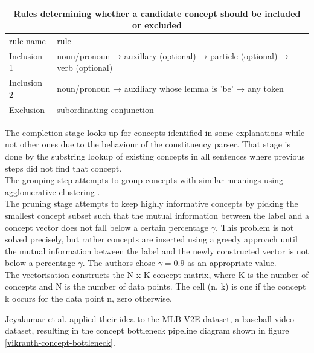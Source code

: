 \begin{center}
\begin{tabular}{ |p{2cm}|p{12cm}|  }
 \hline
 \multicolumn{2}{|c|}{Rules determining whether a candidate concept should be included or excluded} \\
 \hline
 rule name & rule \\
 \hline
 Inclusion 1 & noun/pronoun → auxillary (optional) → particle (optional) → verb (optional) \\
 Inclusion 2 & noun/pronoun → auxiliary whose lemma is 'be' → any token \\
 Exclusion & subordinating conjunction \\
 
 \hline
 
\end{tabular}
\label{inclusion-exclusion-rules}
\end{center}

The completion stage looks up for concepts identified in some explanations while not other ones due to the behaviour of the constituency parser.
That stage is done by the substring lookup of existing concepts in all sentences where previous steps did not find that concept. \\
The grouping step attempts to group concepts with similar meanings using agglomerative clustering \cite{RefWorks:RefID:13-mullner2011modern}.  \\
The pruning stage attempts to keep highly informative concepts by picking the smallest concept subset such that the mutual information \cite{RefWorks:RefID:30-mackay2004information} between the label and a concept vector does not fall below a certain percentage $\gamma$.
This problem is not solved precisely, but rather concepts are inserted using a greedy approach until the mutual information between the label and the newly constructed vector is not below a percentage $\gamma$. The authors chose $\gamma = 0.9$ as an appropriate value. \\
The vectorisation constructs the N x K concept matrix, where K is the number of concepts and N is the number of data points. 
The cell (n, k) is one if the concept k occurs for the data point n, zero otherwise.

Jeyakumar et al. applied their idea to the MLB-V2E dataset, a baseball video dataset, resulting in the concept bottleneck pipeline diagram shown in figure \ref{vikranth-concept-bottleneck}.

